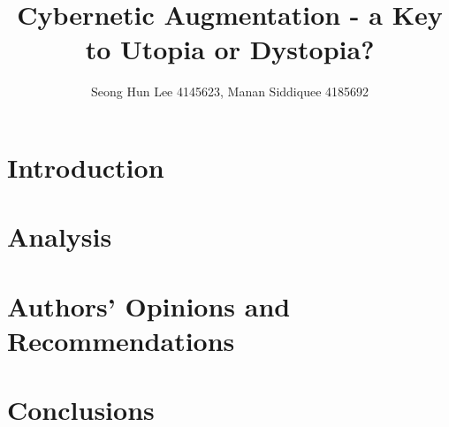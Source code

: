 
	\title{Cybernetic Augmentation - a Key to Utopia or Dystopia?}			  
	



\preauthor{\begin{center} \lineskip 0.1cm }
	\author{Seong Hun Lee 4145623, Manan Siddiquee 4185692}										%
	\postauthor{\end{center}} %

 \date{}																	%




	\section{Introduction} 
	
	\section{Analysis}
    
    
    
    
    \section{Authors' Opinions and Recommendations}
    
    \section{Conclusions}
    



	


